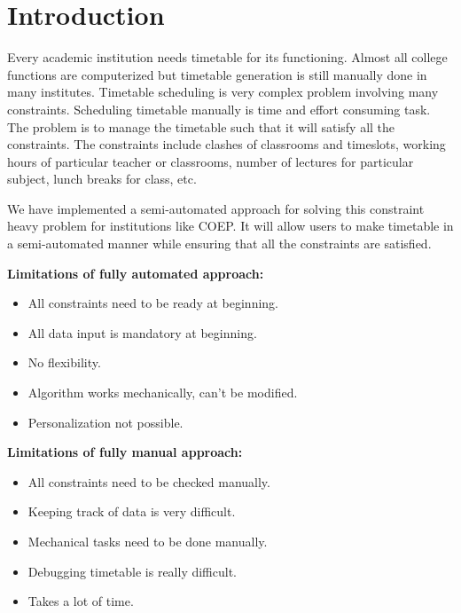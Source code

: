 %

\chapter{Introduction}
Every academic institution needs timetable for its functioning. Almost all college functions are computerized but timetable generation is still manually done in many institutes. Timetable scheduling is very complex problem involving many constraints. Scheduling timetable manually is time and effort consuming task. The problem is to manage the timetable such that it will satisfy all the constraints. The constraints include clashes of classrooms and timeslots, working hours of particular teacher or classrooms, number of lectures for particular subject, lunch breaks for class, etc.

We have implemented a semi-automated approach for solving this constraint heavy problem for institutions like COEP. It will allow users to make timetable  in a semi-automated manner while ensuring that all the constraints are satisfied.

{\bfseries Limitations of fully automated approach:}
\begin{itemize}
\item All constraints need to be ready at beginning.
\item All data input is mandatory at beginning. 
\item No flexibility.
\item Algorithm works mechanically, can't be modified.
\item Personalization not possible.
\end{itemize}

{\bfseries Limitations of fully manual approach:}
\begin{itemize}
\item All constraints need to be checked manually.
\item Keeping track of data is very difficult.
\item Mechanical tasks need to be done manually.
\item Debugging timetable is really difficult.
\item Takes a lot of time.
\end{itemize}

